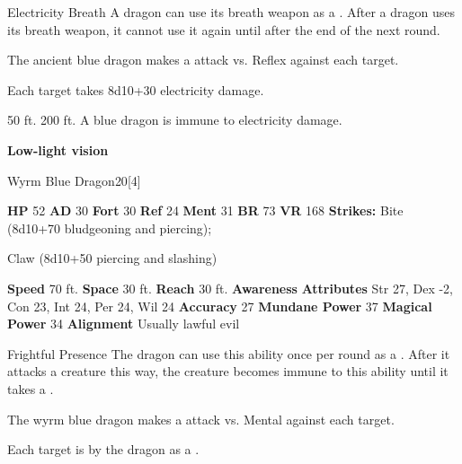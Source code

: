     \begin{freeability}{Electricity Breath}
      A dragon can use its breath weapon as a .
      After a dragon uses its breath weapon, it cannot use it again until after the end of the next round.
      \par The ancient blue dragon makes a  attack
        vs. Reflex against each target.
    
    \hit Each target takes 8d10+30 electricity damage.
    \end{freeability}
  
      
       50 ft.
     200 ft.
     A blue dragon is immune to electricity damage.
    \par\noindent\textbf{Low-light vision}
  

  \begin{monsubsection}{Wyrm Blue Dragon}{20}[4]
    \vspace{-1em}\vspace{-1em}
    \vspace{0em}

    
    

    \begin{spellcontent}
      \begin{spelltargetinginfo}
        \pari \textbf{HP} 52 \monsep
          \textbf{AD} 30 \monsep
          \textbf{Fort} 30 \monsep
          \textbf{Ref} 24 \monsep
          \textbf{Ment} 31
        \pari \textbf{BR} 73 \monsep
        \textbf{VR} 168
        \pari \textbf{Strikes:}
            Bite  (8d10+70 bludgeoning and piercing);
\par Claw  (8d10+50 piercing and slashing)
      \end{spelltargetinginfo}
    \end{spellcontent}
    \begin{monsterfooter}
      \pari \textbf{Speed} 70 ft. \monsep
        \textbf{Space} 30 ft. \monsep
        \textbf{Reach} 30 ft.
      \pari \textbf{Awareness} 
      \pari \textbf{Attributes}
        Str 27, Dex -2,
        Con 23, Int 24,
        Per 24, Wil 24
      \pari \textbf{Accuracy} 27 \monsep
        \textbf{Mundane Power} 37 \monsep
      \textbf{Magical Power} 34
      \pari \textbf{Alignment} Usually lawful evil
    \end{monsterfooter}
  \end{monsubsection}
  \begin{freeability}{Frightful Presence}
      The dragon can use this ability once per round as a .
      After it attacks a creature this way, the creature becomes immune to this ability until it takes a .
      \par The wyrm blue dragon makes a  attack
        vs. Mental against each target.
    
    \hit Each target is  by the dragon as a .
    \end{freeability}
  

